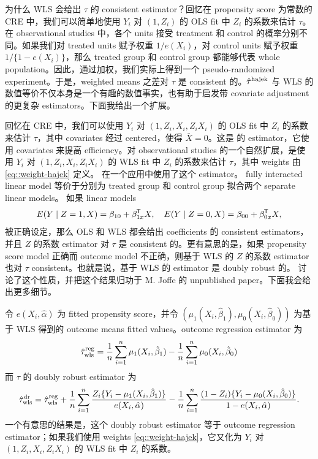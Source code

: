  



为什么 WLS 会给出 $\tau$ 的 consistent estimator？回忆在 propensity score 为常数的 CRE 中，我们可以简单地使用 $Y_i$ 对 $(1,Z_i)$ 的 OLS fit 中 $Z_i$ 的系数来估计 $\tau$。在 observational studies 中，各个 units 接受 treatment 和 control 的概率分别不同。如果我们对 treated units 赋予权重 $1/e(X_i)$，对 control units 赋予权重 $1/\{ 1-e(X_i)\}$，那么 treated group 和 control group 都能够代表 whole population。因此，通过加权，我们实际上得到一个 pseudo-randomized experiment。于是，weighted means 之差对 $\tau$ 是 consistent 的。$\hat{\tau}^\textup{hajek}$ 与 WLS 的数值等价不仅本身是一个有趣的数值事实，也有助于启发带 covariate adjustment 的更复杂 estimators。下面我给出一个扩展。


回忆在 CRE 中，我们可以使用 $Y_i$ 对 $(1,Z_i, X_i, Z_iX_i)$ 的 OLS fit 中 $Z_i$ 的系数来估计 $\tau$，其中 covariates 经过 centered，使得 $\bar{X} = 0$。这是 \citet{lin2013} 的 estimator，它使用 covariates 来提高 efficiency。对 observational studies 的一个自然扩展，是使用 $Y_i$ 对 $(1,Z_i, X_i, Z_iX_i)$ 的 WLS fit 中 $Z_i$ 的系数来估计 $\tau$，其中 weights 由 \eqref{eq::weight-hajek} 定义。\citet{hirano2001estimation} 在一个应用中使用了这个 estimator。
fully interacted linear model 等价于分别为 treated group 和 control group 拟合两个 separate linear models。
如果 linear models
$$
E(Y\mid Z=1, X) = \beta_{10} +  \beta_{1x}^{\mkern-1.5mu\mathsf{T}} X,\quad
E(Y\mid Z=0, X) = \beta_{00} +  \beta_{0x}^{\mkern-1.5mu\mathsf{T}} X,
$$
被正确设定，那么 OLS 和 WLS 都会给出 coefficients 的 consistent estimators，并且 $Z$ 的系数 estimator 对 $\tau$ 是 consistent 的。更有意思的是，如果 propensity score model 正确而 outcome model 不正确，则基于 WLS 的 $Z$ 的系数 estimator 也对 $\tau$ consistent。也就是说，基于 WLS 的 estimator 是 doubly robust 的。\citet{robins2007comment} 讨论了这个性质，并把这个结果归功于 M. Joffe 的 unpublished paper。下面我会给出更多细节。



令 $e(X_i, \hat{\alpha})$ 为 fitted propensity score，并令 $( \mu_1(X_i, \hat{\beta}_1),  \mu_0(X_i, \hat{\beta}_0)) $ 为基于 WLS 得到的 outcome means fitted values。outcome regression estimator 为
$$
\hat{\tau}^\text{reg}_\text{wls} = \frac{1}{n} \sum_{i=1}^n \mu_1(X_i, \hat{\beta}_1) - \frac{1}{n} \sum_{i=1}^n \mu_0(X_i, \hat{\beta}_0)
$$
而 $\tau$ 的 doubly robust estimator 为
$$
\hat{\tau}^\text{dr}_\text{wls}  = 
\hat{\tau}^\text{reg}_\text{wls}  + \frac{1}{n} \sum_{i=1}^n  \frac{Z_i \{ Y_i- \mu_1(X_i, \hat{\beta}_1)\}  }{  e(X_i, \hat{\alpha}) } 
- \frac{1}{n} \sum_{i=1}^n  \frac{(1-Z_i) \{ Y_i- \mu_0(X_i, \hat{\beta}_0)\}  }{  1- e(X_i, \hat{\alpha}) }   .
$$
一个有意思的结果是，这个 doubly robust estimator 等于 outcome regression estimator；如果我们使用 weights \eqref{eq::weight-hajek}，它又化为 $Y_i$ 对 $(1,Z_i, X_i, Z_iX_i)$ 的 WLS fit 中 $Z_i$ 的系数。




